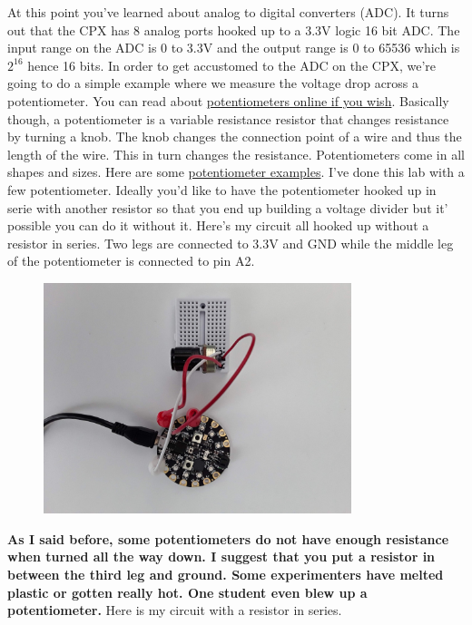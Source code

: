 At this point you've learned about analog to digital converters (ADC). It turns out that the CPX has 8 analog ports hooked up to a 3.3V logic 16 bit ADC. The input range on the ADC is 0 to 3.3V and the output range is 0 to 65536 which is $2^{16}$ hence 16 bits. In order to get accustomed to the ADC on the CPX, we’re going to do a simple example where we measure the voltage drop across a potentiometer. You can read about \href{https://www.build-electronic-circuits.com/potentiometer/}{potentiometers online if you wish}. Basically though, a potentiometer is a variable resistance resistor that changes resistance by turning a knob. The knob changes the connection point of a wire and thus the length of the wire. This in turn changes the resistance. Potentiometers come in all shapes and sizes. Here are some \href{https://uk.rs-online.com/web/content/discovery/ideas-and-advice/potentiometers-guide}{potentiometer examples}. I've done this lab with a few potentiometer. Ideally you'd like to have the potentiometer hooked up in serie with another resistor so that you end up building a voltage divider but it' possible you can do it without it. Here’s my circuit all hooked up without a resistor in series. Two legs are connected to 3.3V and GND while the middle leg of the potentiometer is connected to pin A2.
\begin{figure}[H]
  \begin{center}
    \includegraphics[width=0.8\textwidth]{Figures/potentiometer1.jpeg}
  \end{center}
\end{figure}
{\bf As I said before, some potentiometers do not have enough resistance when turned all the way down. I suggest that you put a resistor in between the third leg and ground. Some experimenters have melted plastic or gotten really hot. One student even blew up a potentiometer.} Here is my circuit with a resistor in series.
